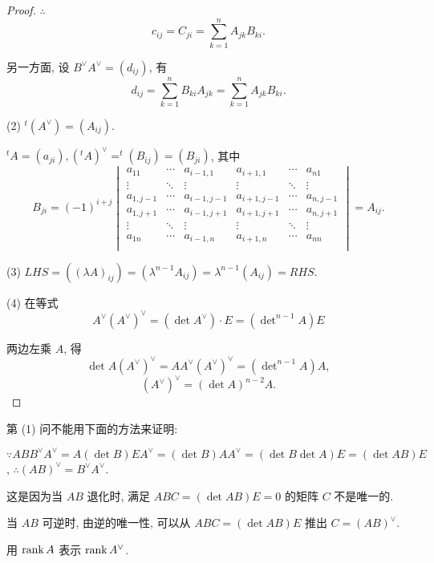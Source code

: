 \documentclass{ctexart}
\begin{document}
\begin{proof}
    $\therefore$
    \[c_{ij}=C_{ji}=\sum\limits_{k=1}^nA_{jk}B_{ki}.\]

    另一方面, 设 $B^\vee A^\vee=(d_{ij})$, 有
    \[d_{ij}=\sum\limits_{k=1}^nB_{ki}A_{jk}=\sum\limits_{k=1}^nA_{jk}B_{ki}.\]

    (2) $^t(A^\vee)=(A_{ij})$.

    $^tA=(a_{ji}),(^tA)^\vee=^t(B_{ij})=(B_{ji})$, 其中
    \[B_{ji}=(-1)^{i+j}\begin{vmatrix}
        a_{11} & \cdots & a_{i-1,1} & a_{i+1,1} & \cdots & a_{n1} \\
        \vdots & \ddots & \vdots & \vdots & \ddots & \vdots \\
        a_{1,j-1} & \cdots & a_{i-1,j-1} & a_{i+1,j-1} & \cdots & a_{n,j-1} \\
        a_{1,j+1} & \cdots & a_{i-1,j+1} & a_{i+1,j+1} & \cdots & a_{n,j+1} \\
        \vdots & \ddots & \vdots & \vdots & \ddots & \vdots \\
        a_{1n} & \cdots & a_{i-1,n} & a_{i+1,n} & \cdots & a_{nn} \\
    \end{vmatrix}=A_{ij}.\]

    (3) $LHS=((\lambda A)_{ij})=(\lambda^{n-1}A_{ij})=\lambda^{n-1}(A_{ij})=RHS$.

    (4) 在等式
    \[A^\vee(A^\vee)^\vee=(\det A^\vee)\cdot E=(\det\nolimits^{n-1}A)E\]

    两边左乘 $A$, 得
    \[\det A(A^\vee)^\vee=AA^\vee(A^\vee)^\vee=(\det\nolimits^{n-1}A)A,\]
    \[(A^\vee)^\vee=(\det A)^{n-2}A.\]
\end{proof}
\begin{note}
    第 (1) 问不能用下面的方法来证明:

    $\because ABB^\vee A^\vee=A(\det B)EA^\vee=(\det B)AA^\vee=(\det B\det A)E=(\det AB)E$, $\therefore (AB)^\vee=B^\vee A^\vee$.

    这是因为当 $AB$ 退化时, 满足 $ABC=(\det AB)E=0$ 的矩阵 $C$ 不是唯一的.

    当 $AB$ 可逆时, 由逆的唯一性, 可以从 $ABC=(\det AB)E$ 推出 $C=(AB)^\vee$.
\end{note}
\begin{exercise}%
    用 $\operatorname{rank} A$ 表示 $\operatorname{rank} A^\vee$.
\end{exercise}
\end{document}
